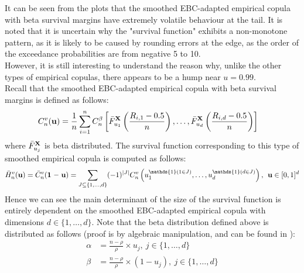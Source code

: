 \documentclass[12pt]{report}
\newcommand{\1}{\mathbf{1}}
\begin{document}
\begin{flushleft}
It can be seen from the plots that the smoothed EBC-adapted empirical copula with beta survival margins have extremely volatile behaviour at the tail. It is noted that it is uncertain why the "survival function" exhibits a non-monotone pattern, as it is likely to be caused by rounding errors at the edge, as the order of the exceedance probabilities are from negative 5 to 10. \\
\vspace{0.5cm}
However, it is still interesting to understand the reason why, unlike the other types of empirical copulas, there appears to be a hump near $u = 0.99$.\\
\vspace{0.5cm}
Recall that the smoothed EBC-adapted empirical copula with beta survival margins is defined as follows:
\begin{align*}
C_{n}^{v}(\textbf{u}) &= \frac{1}{n} \sum\limits_{i = 1}^{n} C_{n}^{\beta} \left[\Bar{F}_{u_{1}}^{\textbf{X}}\left(\frac{R_{i,1} - 0.5}{n}\right), \dots, \Bar{F}_{u_{d}}^{\textbf{X}}\left(\frac{R_{i,d} - 0.5}{n}\right) \right]
\end{align*}
where $\Bar{F}_{u_{j}}^{\textbf{X}}$ is beta distributed. The survival function corresponding to this type of smoothed empirical copula is computed as follows:
\begin{align*}
\Bar{H}^{v}_{n}(\textbf{u}) = \Bar{C}^{v}_{n}(\textbf{1 -- u}) = \sum\limits_{J \subseteq \{1, \dots, d \} }(-1)^{|J|} C^{v}_{n} \left( u_{1}^{\mathds{1}(1\in J)}, \dots, u_{d}^{\mathds{1}(d\in J)} \right), \: \: \textbf{u} \in [0,1]^{d}
\end{align*}
Hence we can see the main determinant of the size of the survival function is entirely dependent on the smoothed EBC-adapted empirical copula with dimensions $d \in \{1, \dots, d\}$. Note that the beta distribution defined above is distributed as follows (proof is by algebraic manipulation, and can be found in \cite{KojadinovicYi2024Smooth}):
\begin{align*}
\alpha &= \frac{n - \rho}{\rho} \times u_{j}, \: j \in \{1, \dots, d\} \\
\beta &= \frac{n - \rho}{\rho} \times (1 - u_{j}), \: j \in \{1, \dots, d\}
\end{align*}

\end{flushleft}
\end{document}
